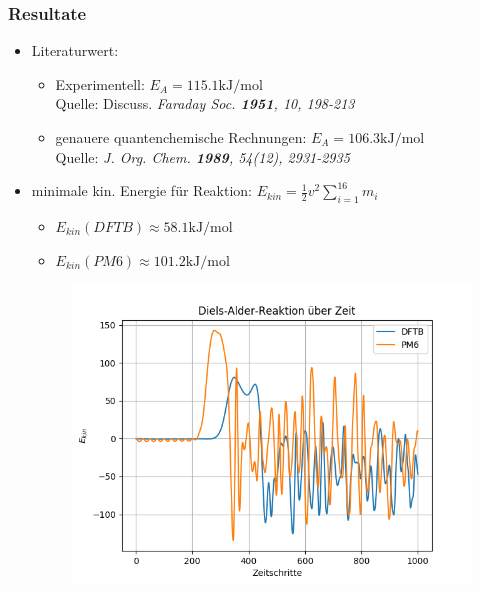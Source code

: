 \begin{frame}
  \frametitle{Resultate}
  \begin{itemize}
    \item Literaturwert:
    \begin{itemize}
      \item \small Experimentell: $E_A = 115.1 \si{\kilo\joule\per\mol}$
      \\  \tiny{Quelle: Discuss. \textit{Faraday Soc. \textbf{1951}, 10, 198-213}}
      \item \small genauere quantenchemische Rechnungen: $E_A = 106.3 \si{\kilo\joule\per\mol}$
      \\  \tiny{Quelle: \textit{J. Org. Chem. \textbf{1989}, 54(12), 2931-2935}}
    \end{itemize}
    \item \normalsize minimale kin. Energie für Reaktion: $E_{kin}=\frac{1}{2}v^2\sum_{i=1}^{16}m_i$
    \begin{itemize}
      \item $E_{kin}(DFTB) \approx 58.1 \si{\kilo\joule\per\mol}$
      \item $E_{kin}(PM6) \approx 101.2 \si{\kilo\joule\per\mol}$
    \end{itemize}
    \begin{figure}
      \includegraphics[scale=0.37]{dftb1_19pm61_57Data.png}
    \end{figure}
  \end{itemize}
\end{frame}
